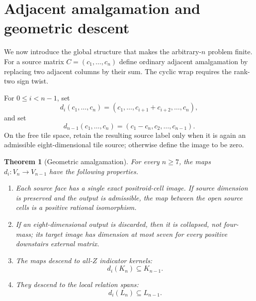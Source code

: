 \documentclass[11pt]{article}
\newtheorem{theorem}{Theorem}[section]
\newcommand{\1}{\mathbf 1}
\begin{document}
\section{Adjacent amalgamation and geometric descent}
\label{sec:amalgamation}

We now introduce the global structure that makes the arbitrary-$n$ problem
finite.  For a source matrix $C=(c_1,\dots,c_n)$ define ordinary adjacent
amalgamation by replacing two adjacent columns by their sum.  The cyclic
wrap requires the rank-two sign twist.

For $0\le i<n-1$, set
\begin{equation}\label{eq:facesordinary}
d_i(c_1,\dots,c_n)
=(c_1,\dots,c_{i+1}+c_{i+2},\dots,c_n),
\end{equation}
and set
\begin{equation}\label{eq:facewrap}
d_{n-1}(c_1,\dots,c_n)=(c_1-c_n,c_2,\dots,c_{n-1}).
\end{equation}
On the free tile space, retain the resulting source label only when it is
again an admissible eight-dimensional tile source; otherwise define the
image to be zero.

\begin{theorem}[Geometric amalgamation]\label{thm:amalgamation}
For every $n\ge7$, the maps $d_i:V_n\to V_{n-1}$ have the following
properties.
\begin{enumerate}[label=(\roman*)]
\item Each source face has a single exact positroid-cell image.  If source
dimension is preserved and the output is admissible, the map between the
open source cells is a positive rational isomorphism.
\item If an eight-dimensional output is discarded, then it is collapsed,
not four-mass; its target image has dimension at most seven for every
positive downstairs external matrix.
\item The maps descend to all-$Z$ indicator kernels:
\[
d_i(K_n)\subseteq K_{n-1}.
\]
\item They descend to the local relation spans:
\[
d_i(L_n)\subseteq L_{n-1}.
\]
\end{enumerate}
\end{theorem}
\end{document}
